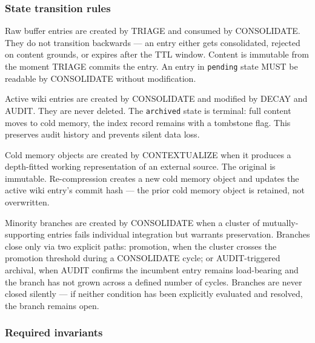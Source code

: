 \documentclass[
  11pt,
]{article}
\begin{document}
\hypertarget{state-transition-rules}{%
\subsubsection{State transition rules}\label{state-transition-rules}}

Raw buffer entries are created by TRIAGE and consumed by CONSOLIDATE.
They do not transition backwards --- an entry either gets consolidated,
rejected on content grounds, or expires after the TTL window. Content is
immutable from the moment TRIAGE commits the entry. An entry in
\texttt{pending} state MUST be readable by CONSOLIDATE without
modification.

Active wiki entries are created by CONSOLIDATE and modified by DECAY and
AUDIT. They are never deleted. The \texttt{archived} state is terminal:
full content moves to cold memory, the index record remains with a
tombstone flag. This preserves audit history and prevents silent data
loss.

Cold memory objects are created by CONTEXTUALIZE when it produces a
depth-fitted working representation of an external source. The original
is immutable. Re-compression creates a new cold memory object and
updates the active wiki entry's commit hash --- the prior cold memory
object is retained, not overwritten.

Minority branches are created by CONSOLIDATE when a cluster of
mutually-supporting entries fails individual integration but warrants
preservation. Branches close only via two explicit paths: promotion,
when the cluster crosses the promotion threshold during a CONSOLIDATE
cycle; or AUDIT-triggered archival, when AUDIT confirms the incumbent
entry remains load-bearing and the branch has not grown across a defined
number of cycles. Branches are never closed silently --- if neither
condition has been explicitly evaluated and resolved, the branch remains
open.

\hypertarget{required-invariants}{%
\subsubsection{Required invariants}\label{required-invariants}}
\end{document}
